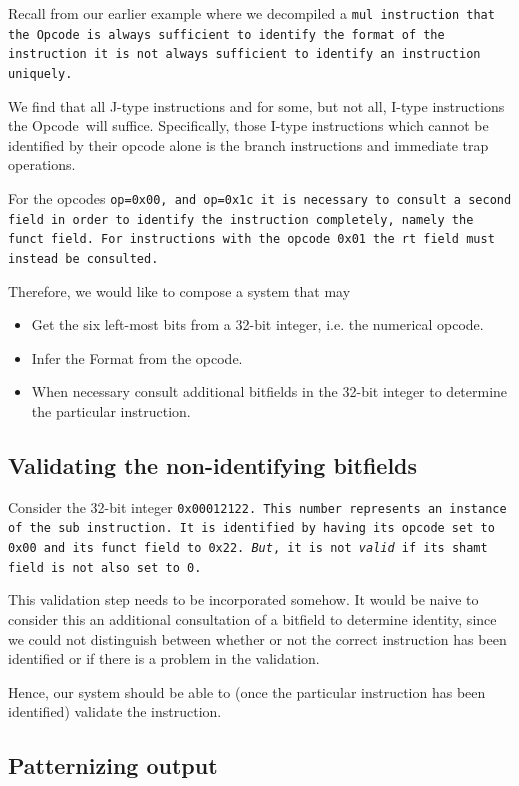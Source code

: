\documentclass[a4paper]{article}
\newcommand{\opcode}{Opcode\ }
\begin{document}
Recall from our earlier example where we decompiled a \tt{mul}
instruction that the \opcode is always sufficient to identify
the format of the instruction it is not always sufficient to
identify an instruction uniquely.

We find that all J-type instructions and for some, but not all, I-type
instructions the \opcode will suffice. Specifically, those I-type
instructions which cannot be identified by their opcode alone is the
branch instructions and immediate trap operations.

For the opcodes \tt{op=0x00}, and \tt{op=0x1c} it is necessary to
consult a second field in order to identify the instruction
completely, namely the \tt{funct} field. For instructions with the
opcode \tt{0x01} the \tt{rt} field must instead be consulted.

Therefore, we would like to compose a system that may

\begin{itemize}
\item Get the six left-most bits from a 32-bit integer, i.e. the numerical opcode.
\item Infer the Format from the opcode.
\item When necessary consult additional bitfields in the 32-bit integer to
      determine the particular instruction.
\end{itemize}

\subsection{Validating the non-identifying bitfields}\label{section:validation}

Consider the 32-bit integer \tt{0x00012122}. This number represents an
instance of the \tt{sub} instruction. It is identified by
having its opcode set to \tt{0x00} and its funct field to \tt{0x22}.
\emph{But}, it is not \emph{valid} if its shamt field is not also set to 0.

This validation step needs to be incorporated somehow. It would be
naive to consider this an additional consultation of a bitfield to
determine identity, since we could not distinguish between whether or
not the correct instruction has been identified or if there is a
problem in the validation.

Hence, our system should be able to (once the particular instruction
has been identified) validate the instruction.

\subsection{Patternizing output}\label{section:patternizing}
\end{document}
